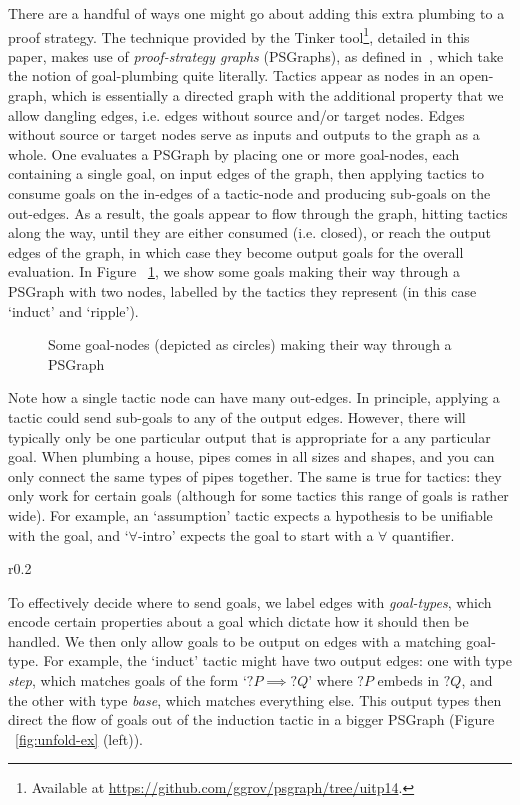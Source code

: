 \documentclass[submission,copyright,creativecommons]{eptcs}
\begin{document}
There are a handful of ways one might go about adding this extra plumbing to a proof strategy. The technique provided by the Tinker tool\footnote{
Available at \url{https://github.com/ggrov/psgraph/tree/uitp14}.}, detailed in this paper, makes use of \textit{proof-strategy graphs} (PSGraphs), as defined in~\cite{LPAR13}, which take the notion of goal-plumbing quite literally. Tactics appear as nodes in an open-graph, which is essentially a directed graph with the additional property that we allow dangling edges, i.e. edges without source and/or target nodes. Edges without source or target nodes serve as inputs and outputs to the graph as a whole. One evaluates a PSGraph by placing one or more goal-nodes, each containing a single goal, on input edges of the graph, then applying tactics to consume goals on the in-edges of a tactic-node and producing sub-goals on the out-edges. As a result, the goals appear to flow through the graph, hitting tactics along the way, until they are either consumed (i.e. closed), or reach the output edges of the graph, in which case they become output goals for the overall evaluation. In Figure ~\ref{fig:ripple-ex}, we show some goals making their way through a PSGraph with two nodes, labelled by the tactics they represent (in this case `induct' and `ripple').
\begin{figure}
  \centering
  \caption{Some goal-nodes (depicted as circles) making their way through a PSGraph}\label{fig:ripple-ex}
\end{figure}

Note how a single tactic node can have many out-edges. In principle, applying a tactic could send sub-goals to any of the output edges. However, there will typically only be one particular output that is appropriate for a any particular goal. When plumbing a house, pipes comes in all sizes and shapes, and you can only connect the same types of pipes together. The same is true for tactics: they only work for certain goals (although for some tactics this range of goals is rather wide). For example, an `assumption' tactic expects a hypothesis to be unifiable with the goal, and `$\forall$-intro' expects the goal to start with a $\forall$ quantifier. 

\begin{wrapfigure}[6]{r}{0.2\textwidth}
  \centering
\end{wrapfigure}
To effectively decide where to send goals, we label edges with \textit{goal-types}, which encode certain properties about a goal which dictate how it should then be handled. We then only allow goals to be output on edges with a matching goal-type. For example, the `induct' tactic might have two output edges: one with type \textit{step}, which matches goals of the form `$?P \implies ?Q$' where $?P$ embeds in $?Q$, and the other with type \textit{base}, which matches everything else. This output types then direct the flow of goals out of the induction tactic in a bigger PSGraph (Figure ~\ref{fig:unfold-ex} (left)).
\end{document}
